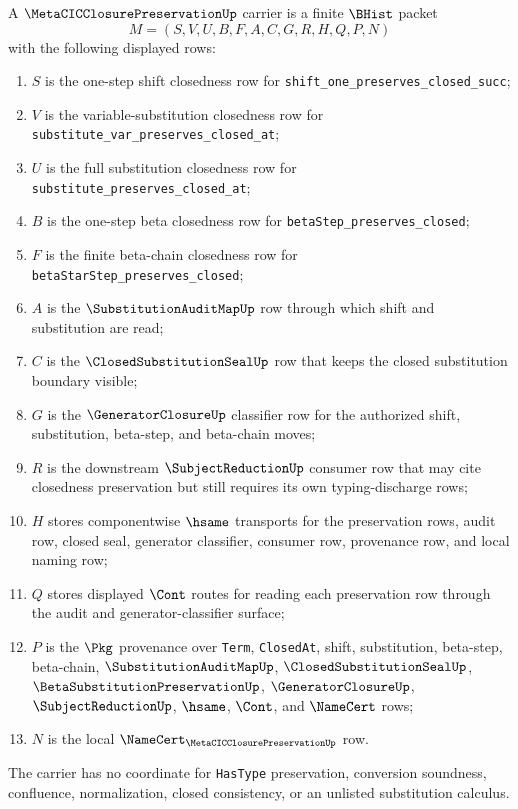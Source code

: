 \begin{definition}
\label{def:metacic-closure-preservation-carrier}
A $\MetaCICClosurePreservationUp$ carrier is a finite $\BHist$ packet
$$
M=(S,V,U,B,F,A,C,G,R,H,Q,P,N)
$$
with the following displayed rows:
\begin{enumerate}
\item $S$ is the one-step shift closedness row for \texttt{shift\_one\_preserves\_closed\_succ};
\item $V$ is the variable-substitution closedness row for \texttt{substitute\_var\_preserves\_closed\_at};
\item $U$ is the full substitution closedness row for \texttt{substitute\_preserves\_closed\_at};
\item $B$ is the one-step beta closedness row for \texttt{betaStep\_preserves\_closed};
\item $F$ is the finite beta-chain closedness row for \texttt{betaStarStep\_preserves\_closed};
\item $A$ is the $\SubstitutionAuditMapUp$ row through which shift and substitution are read;
\item $C$ is the $\ClosedSubstitutionSealUp$ row that keeps the closed substitution boundary visible;
\item $G$ is the $\GeneratorClosureUp$ classifier row for the authorized shift, substitution, beta-step, and beta-chain moves;
\item $R$ is the downstream $\SubjectReductionUp$ consumer row that may cite closedness preservation but still requires its own typing-discharge rows;
\item $H$ stores componentwise $\hsame$ transports for the preservation rows, audit row, closed seal, generator classifier, consumer row, provenance row, and local naming row;
\item $Q$ stores displayed $\Cont$ routes for reading each preservation row through the audit and generator-classifier surface;
\item $P$ is the $\Pkg$ provenance over \texttt{Term}, \texttt{ClosedAt}, shift, substitution, beta-step, beta-chain, $\SubstitutionAuditMapUp$, $\ClosedSubstitutionSealUp$, $\BetaSubstitutionPreservationUp$, $\GeneratorClosureUp$, $\SubjectReductionUp$, $\hsame$, $\Cont$, and $\NameCert$ rows;
\item $N$ is the local $\NameCert_{\MetaCICClosurePreservationUp}$ row.
\end{enumerate}
The carrier has no coordinate for \texttt{HasType} preservation, conversion soundness, confluence, normalization, closed consistency, or an unlisted substitution calculus.
\end{definition}

